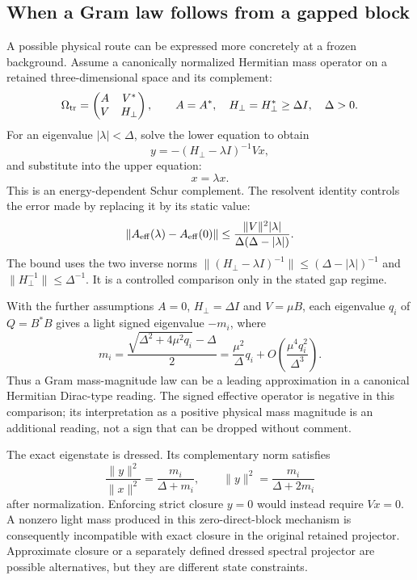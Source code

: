 \documentclass[11pt,a4paper]{article}
\begin{document}
\subsection{When a Gram law follows from a gapped block}
A possible physical route can be expressed more concretely at a
frozen background. Assume a canonically normalized Hermitian mass
operator on a retained three-dimensional space and its complement:
\begin{equation}
 \Omega_{\rm tr}=\begin{pmatrix}A&V^*\\V&H_\perp\end{pmatrix},
 \qquad A=A^*,\quad H_\perp=H_\perp^*\geq\Delta I,
 \quad \Delta>0.
\end{equation}
For an eigenvalue $|\lambda|<\Delta$, solve the lower equation to obtain
\begin{equation}
 y=-(H_\perp-\lambda I)^{-1}Vx,
\end{equation}
and substitute into the upper equation:
\begin{equation}
 [A-V^*(H_\perp-\lambda I)^{-1}V]x=\lambda x.
\end{equation}
This is an energy-dependent Schur complement. The resolvent identity
controls the error made by replacing it by its static value:
\begin{equation}
 \|A_{\rm eff}(\lambda)-A_{\rm eff}(0)\|
 \leq\frac{\|V\|^2|\lambda|}{\Delta(\Delta-|\lambda|)}.
\end{equation}
The bound uses the two inverse norms
$\|(H_\perp-\lambda I)^{-1}\|\leq(\Delta-|\lambda|)^{-1}$
and $\|H_\perp^{-1}\|\leq\Delta^{-1}$. It is a controlled
comparison only in the stated gap regime.

With the further assumptions $A=0$, $H_\perp=\Delta I$ and
$V=\mu B$, each eigenvalue $q_i$ of $Q=B^*B$ gives a light
signed eigenvalue $-m_i$, where
\begin{equation}
 m_i=\frac{\sqrt{\Delta^2+4\mu^2q_i}-\Delta}{2}
 =\frac{\mu^2}{\Delta}q_i
  +O\left(\frac{\mu^4q_i^2}{\Delta^3}\right).
\end{equation}
Thus a Gram mass-magnitude law can be a leading approximation in
a canonical Hermitian Dirac-type reading. The signed effective
operator is negative in this comparison; its interpretation as a
positive physical mass magnitude is an additional reading, not
a sign that can be dropped without comment.

The exact eigenstate is dressed. Its complementary norm satisfies
\begin{equation}
 \frac{\|y\|^2}{\|x\|^2}=\frac{m_i}{\Delta+m_i},\qquad
 \|y\|^2=\frac{m_i}{\Delta+2m_i}
\end{equation}
after normalization. Enforcing strict closure $y=0$ would instead
require $Vx=0$. A nonzero light mass produced in this zero-direct-block
mechanism is consequently incompatible with exact closure in the
original retained projector. Approximate closure or a separately
defined dressed spectral projector are possible alternatives, but
they are different state constraints.
\end{document}
